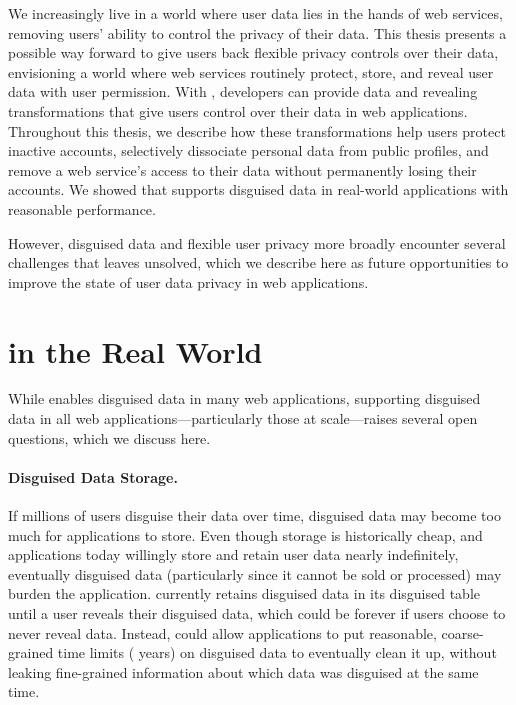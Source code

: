 We increasingly live in a world where user data lies in the hands of web
services, removing users' ability to control the privacy of their data.
%
This thesis presents a possible way forward to give users back flexible privacy
controls over their data, envisioning a world where web services routinely
protect, store, and reveal \xxed user data with user permission.
%
With \sys, developers can provide data \xxing and revealing transformations that
give users control over their data in web applications.
%
Throughout this thesis, we describe how these transformations help users protect
inactive accounts, selectively dissociate personal data from public profiles,
and remove a web service's access to their data without permanently losing their
accounts.
%
We showed that \sys supports disguised data in real-world applications with
reasonable performance.
%

However, disguised data and flexible user privacy more broadly encounter several
challenges that \sys leaves unsolved, which we describe here as future
opportunities to improve the state of user data privacy in web applications.
%

\section{\sys in the Real World}

While \sys enables disguised data in many web applications, supporting disguised
data in all web applications---particularly those at scale---raises several
open questions, which we discuss here. 

%
\paragraph{Disguised Data Storage.}
If \eg millions of users disguise their data over time, disguised data may
become too much for applications to store.
%
Even though storage is historically cheap, and applications today willingly
store and retain user data nearly indefinitely, eventually disguised data
(particularly since it cannot be sold or processed) may burden the application.
%
\sys currently retains disguised data in its disguised table until a user reveals
their disguised data, which could be forever if users choose to never reveal
data.
%
Instead, \sys could allow applications to put reasonable, coarse-grained time
limits ( years) on disguised data to eventually clean it up, without
leaking fine-grained information about which data was disguised at the same
time.
%

